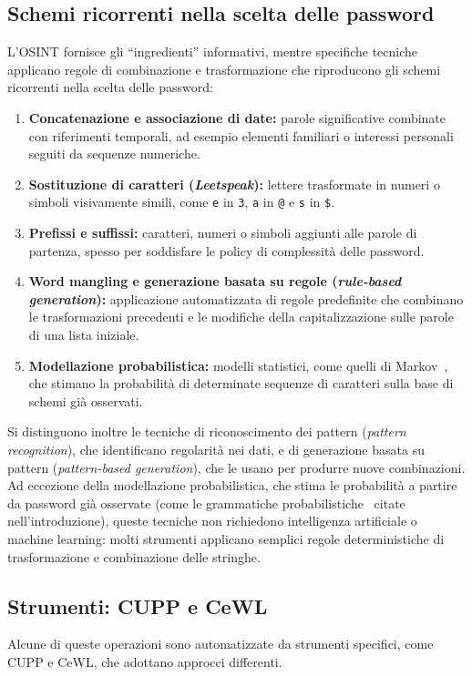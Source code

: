 \subsection{Schemi ricorrenti nella scelta delle password}
L'OSINT fornisce gli ``ingredienti'' informativi, mentre specifiche tecniche applicano regole di combinazione e trasformazione che riproducono gli schemi ricorrenti nella scelta delle password:
\begin{enumerate}
    \item \textbf{Concatenazione e associazione di date:} parole significative combinate con riferimenti temporali, ad esempio elementi familiari o interessi personali seguiti da sequenze numeriche.
    \item \textbf{Sostituzione di caratteri (\textit{Leetspeak}):} lettere trasformate in numeri o simboli visivamente simili, come \texttt{e} in \texttt{3}, \texttt{a} in \texttt{@} e \texttt{s} in \texttt{\$}.
    \item \textbf{Prefissi e suffissi:} caratteri, numeri o simboli aggiunti alle parole di partenza, spesso per soddisfare le policy di complessità delle password.
    \item \textbf{Word mangling e generazione basata su regole (\textit{rule-based generation}):} applicazione automatizzata di regole predefinite che combinano le trasformazioni precedenti e le modifiche della capitalizzazione sulle parole di una lista iniziale.
    \item \textbf{Modellazione probabilistica:} modelli statistici, come quelli di Markov~\cite{narayanan2005}, che stimano la probabilità di determinate sequenze di caratteri sulla base di schemi già osservati.
\end{enumerate}
Si distinguono inoltre le tecniche di riconoscimento dei pattern (\textit{pattern recognition}), che identificano regolarità nei dati, e di generazione basata su pattern (\textit{pattern-based generation}), che le usano per produrre nuove combinazioni.
Ad eccezione della modellazione probabilistica, che stima le probabilità a partire da password già osservate (come le grammatiche probabilistiche~\cite{weir2009} citate nell'introduzione), queste tecniche non richiedono intelligenza artificiale o machine learning: molti strumenti applicano semplici regole deterministiche di trasformazione e combinazione delle stringhe.

\subsection{Strumenti: CUPP e CeWL}
Alcune di queste operazioni sono automatizzate da strumenti specifici, come CUPP e CeWL, che adottano approcci differenti.

